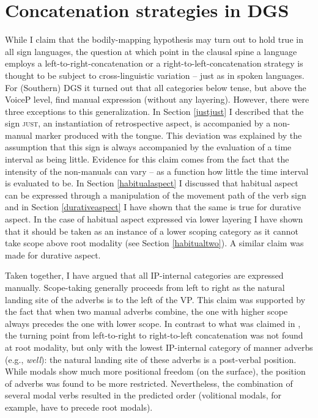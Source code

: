 \section{Concatenation strategies in DGS}\label{concatenatiostrategies}
While I claim that the bodily-mapping hypothesis may turn out to hold true in all sign languages, the question at which point in the clausal spine a language employs a left-to-right-concatenation or a right-to-left-concatenation strategy is thought to be subject to cross-linguistic variation -- just as in spoken languages. For (Southern) DGS it turned out that all categories below tense, but above the VoiceP level, find manual expression (without any layering). However, there were three exceptions to this generalization. In Section \ref{justjust} I described that the sign \textsc{just}, an instantiation of retrospective aspect, is accompanied by a non-manual marker produced with the tongue. This deviation was explained by the assumption that this sign is always accompanied by the evaluation of a time interval as being little. Evidence for this claim comes from the fact that the intensity of the non-manuals can vary -- as a function how little the time interval is evaluated to be. In Section \ref{habitualaspect} I discussed that habitual aspect can be expressed through a manipulation of the movement path of the verb sign and in Section \ref{durativeaspect} I have shown that the same is true for durative aspect. In the case of habitual aspect expressed via lower layering I have shown that it should be taken as an instance of a lower scoping category as it cannot take scope above root modality (see Section \ref{habitualtwo}). A similar claim was made for durative aspect.

Taken together, I have argued that all IP-internal categories are expressed manually. Scope-taking generally proceeds from left to right as the natural landing site of the adverbs is to the left of the VP. This claim was supported by the fact that when two manual adverbs combine, the one with higher scope always precedes the one with lower scope. In contrast to what was claimed in \citet{bross2017scope}, the turning point from left-to-right to right-to-left concatenation was not found at root modality, but only with the lowest IP-internal category of manner adverbs (e.g., \textit{well}): the natural landing site of these adverbs is a post-verbal position. While modals show much more positional freedom (on the surface), the position of adverbs was found to be more restricted. Nevertheless, the combination of several modal verbs resulted in the predicted order (volitional modals, for example, have to precede root modals). 

